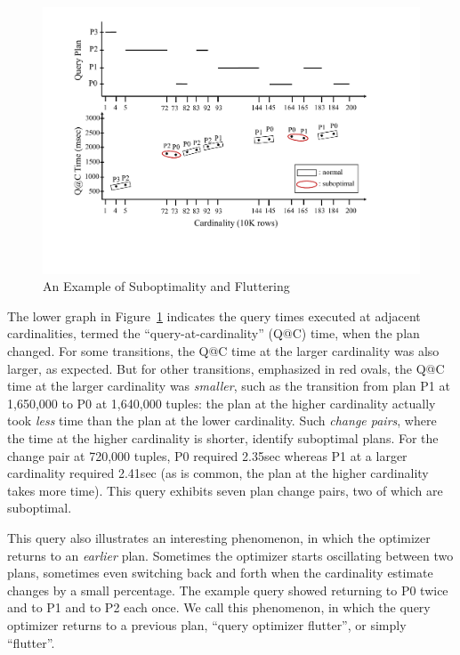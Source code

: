 \documentclass[prodmode,acmtods]{acmsmall}
\begin{document}
\begin{figure}[t]
\centering
\includegraphics[width=30pc]{figures/subopt_flutter.pdf}
\caption{An Example of Suboptimality and Fluttering\label{fig:query769}}
\end{figure}

The lower graph in Figure~\ref{fig:query769} indicates the query times
executed at adjacent cardinalities, termed the
``query-at-cardinality'' (Q@C) time, when the plan changed. For some transitions, the Q@C time at
the larger cardinality was also larger, as expected. But for other
transitions, emphasized in red ovals, the Q@C time at the larger cardinality
was {\em smaller}, such as the transition from plan P1 at 1,650,000 to P0 at 1,640,000
tuples: the plan at the higher cardinality actually took {\em less} time
than the plan at the lower cardinality. Such {\em change pairs}, where the time at the
  higher cardinality is shorter, identify suboptimal plans. For the change pair at 720,000
tuples, P0 required 2.35sec whereas P1 at a larger cardinality required
2.41sec (as is common, the plan at the higher cardinality takes more time). This query exhibits seven plan change pairs, two of which are suboptimal.

This query also illustrates an interesting phenomenon, in which the
optimizer returns to an {\em earlier} plan. Sometimes the
optimizer starts oscillating between two plans, sometimes even switching
back and forth when the cardinality estimate changes by a small
percentage. The example query showed returning to P0 twice and to P1 and to
P2 each once.
We call this phenomenon, in which
the query optimizer returns to a previous plan,
``query optimizer flutter'', or simply ``flutter''.
\end{document}
